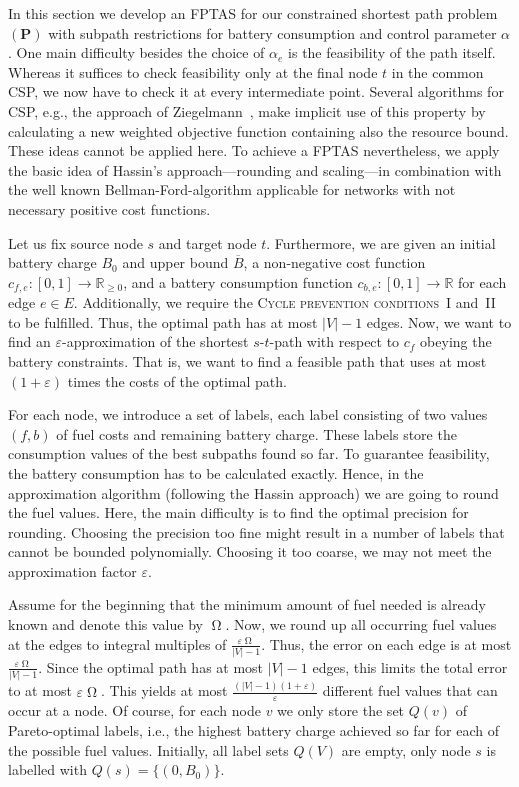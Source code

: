 \documentclass[a4paper]{scrartcl}
\newcommand{\OPT}{\ensuremath{\operatorname{\Omega}}}
\newcommand{\R}{\mathbb{R}}
\begin{document}
In this section we develop an FPTAS for our constrained shortest path problem $\bm{(P)}$ with subpath restrictions for battery consumption and control parameter $\alpha$. One main difficulty besides the choice of $\alpha_e$ is the feasibility of the path itself. Whereas it suffices to check feasibility only at the final node $t$ in the common CSP, we now have to check it at every intermediate point. Several algorithms for CSP, e.g., the approach of Ziegelmann~\cite{Ziegelmann_CSP}, make implicit use of this property by calculating a new weighted objective function containing also the resource bound. These ideas cannot be applied here. To achieve a {FPTAS} nevertheless, we apply the basic idea of Hassin's approach---rounding and scaling---in combination with the well known Bellman-Ford-algorithm applicable for networks with not necessary positive cost functions.

Let us fix source node $s$ and target node $t$. Furthermore, we are given an initial battery charge $B_0$ and upper bound $\overline{B}$, a non-negative cost function $c_{f,e} : [0,1] \to \R_{\geq 0}$, and a battery consumption function $c_{b,e} : [0,1] \to \R$ for each edge $e\in E$. Additionally, we require the \textsc{Cycle prevention conditions~I} and~\textsc{II} to be fulfilled. Thus, the optimal path has at most $|V|-1$ edges. Now, we want to find an $\varepsilon$-approximation of the shortest $s$-$t$-path with respect to $c_f$ obeying the battery constraints. That is, we want to find a feasible path that uses at most $(1+\varepsilon)$ times the costs of the optimal path. 

For each node, we introduce a set of labels, each label consisting of two values $(f,b)$ of fuel costs and remaining battery charge. These labels store the consumption values of the best subpaths found so far. To guarantee feasibility, the battery consumption has to be calculated exactly. Hence, in the approximation algorithm (following the Hassin approach) we are going to round the fuel values. Here, the main difficulty is to find the optimal precision for rounding. Choosing the precision too fine might result in a number of labels that cannot be bounded polynomially. Choosing it too coarse, we may not meet the approximation factor $\varepsilon$. 

Assume for the beginning that the minimum amount of fuel needed is already known and denote this value by \OPT. Now, we round up all occurring fuel values at the edges to integral multiples of $\frac{\varepsilon \OPT}{|V|-1}$. Thus, the error on each edge is at most $\frac{\varepsilon \OPT}{|V|-1}$. Since the optimal path  has at most $|V|-1$ edges, this limits the total error to at most ${\varepsilon \OPT}$. This yields at most $\frac{(|V|-1)(1+\varepsilon)}{\varepsilon}$ different fuel values that can occur at a node. Of course, for each node $v$ we only store the set $Q(v)$ of Pareto-optimal labels, i.e., the highest battery charge achieved so far for each of the possible fuel values. Initially, all label sets $Q(V)$ are empty, only node $s$ is labelled with $Q(s)=\{(0,B_0)\}$. 
\end{document}
